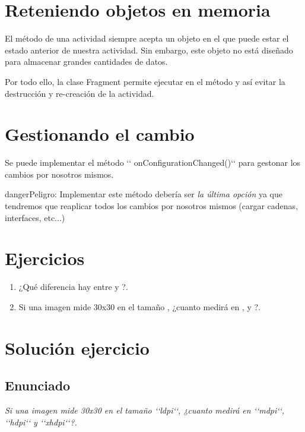 \documentclass[a4paper,12pt,spanish]{sphinxmanual}
\begin{document}
\section{Reteniendo objetos en memoria}
\label{tema1:reteniendo-objetos-en-memoria}
El método  de una actividad siempre acepta un objeto  en el que puede estar el estado anterior de nuestra actividad. Sin embargo, este objeto no está diseñado para almacenar grandes cantidades de datos.

Por todo ello, la clase Fragment permite ejecutar  en el método  y así evitar la destrucción y re-creación de la actividad.


\section{Gestionando el cambio}
\label{tema1:gestionando-el-cambio}
Se puede implementar el método {}`{}` onConfigurationChanged(){}`{}` para gestonar los cambios por nosotros mismos.

\begin{notice}{danger}{Peligro:}
Implementar este método debería ser \emph{la última opción} ya que tendremos que reaplicar todos los cambios por nosotros mismos (cargar cadenas, interfaces, etc...)
\end{notice}


\section{Ejercicios}
\label{tema1:id4}\begin{enumerate}
\item {} 
¿Qué diferencia hay entre  y ?.

\item {} 
Si una imagen mide 30x30 en el tamaño , ¿cuanto medirá en ,  y ?.

\end{enumerate}


\section{Solución ejercicio}
\label{tema1:solucion-ejercicio}

\subsection{Enunciado}
\label{tema1:id5}
\emph{Si una imagen mide 30x30 en el tamaño {}`{}`ldpi{}`{}`, ¿cuanto medirá en {}`{}`mdpi{}`{}`, {}`{}`hdpi{}`{}` y {}`{}`xhdpi{}`{}`?.}
\end{document}
